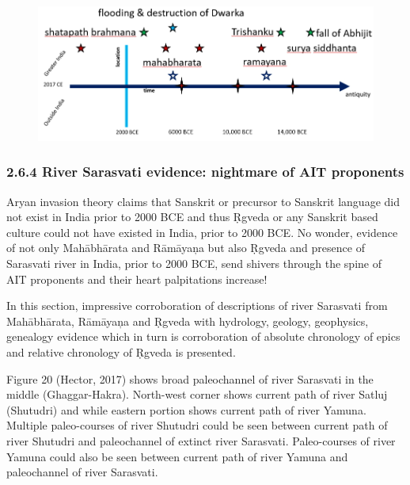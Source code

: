\begin{figure}[!htbp]
\includegraphics[scale=0.31]{images/8-19.jpg}
\caption{}\label{art8-fig19}
\end{figure}


\subsubsection*{2.6.4 River Sarasvati evidence: nightmare of AIT proponents}

Aryan invasion theory claims that Sanskrit or precursor to Sanskrit language did not exist in India prior to 2000 BCE and thus Ṛgveda or any Sanskrit based culture could not have existed in India, prior to 2000 BCE. No wonder, evidence of not only Mahābhārata and Rāmāyaņa but also Ṛgveda and presence of Sarasvati river in India, prior to 2000 BCE, send shivers through the spine of AIT proponents and their heart palpitations increase!

In this section, impressive corroboration of descriptions of river Sarasvati from Mahābhārata, Rāmāyaņa and Ṛgveda with hydrology, geology, geophysics, genealogy evidence which in turn is corroboration of absolute chronology of epics and relative chronology of Ṛgveda is presented.

Figure 20 (Hector, 2017) shows broad paleochannel of river Sarasvati in the middle (Ghaggar-Hakra). North-west corner shows current path of river Satluj (Shutudri) and while eastern portion shows current path of river Yamuna. Multiple paleo-courses of river Shutudri could be seen between current path of river Shutudri and paleochannel of extinct river Sarasvati. Paleo-courses of river Yamuna could also be seen between current path of river Yamuna and paleochannel of river Sarasvati.

